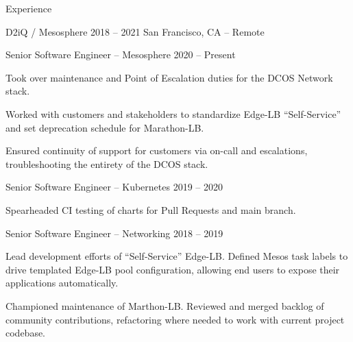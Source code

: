 \documentclass{resume}
\begin{document}
\begin{rSection}{Experience}
        \begin{rSubsection}{D2iQ / Mesosphere}
            {2018 -- 2021} %
            {San Francisco, CA -- Remote} %
            \begin{rSubsubsection}{Senior Software Engineer -- Mesosphere} %
                {2020 -- Present} %
                {\small
            \item Took over maintenance and Point of Escalation duties for the DCOS
                Network stack.
            \item Worked with customers and stakeholders to standardize Edge-LB
                ``Self-Service'' and set deprecation schedule for Marathon-LB\@.
            \item Ensured continuity of support for customers via on-call and
                escalations, troubleshooting the entirety of the DCOS stack.
                }
            \end{rSubsubsection}
            \begin{rSubsubsection}{Senior Software Engineer -- Kubernetes} %
                {2019 -- 2020} %
                {\small
            \item Spearheaded CI testing of charts for Pull Requests and main branch.
                }
            \end{rSubsubsection}
            \begin{rSubsubsection}{Senior Software Engineer -- Networking} %
                {2018 -- 2019} %
                {\small
            \item Lead development efforts of ``Self-Service'' Edge-LB\@. Defined Mesos
                task labels to drive templated Edge-LB pool configuration, allowing
                end users to expose their applications automatically.
            \item Championed maintenance of Marthon-LB\@. Reviewed and merged backlog of
                community contributions, refactoring where needed to work with current
                project codebase.
                }
            \end{rSubsubsection}
        \end{rSubsection}


\end{rSection}
\end{document}
